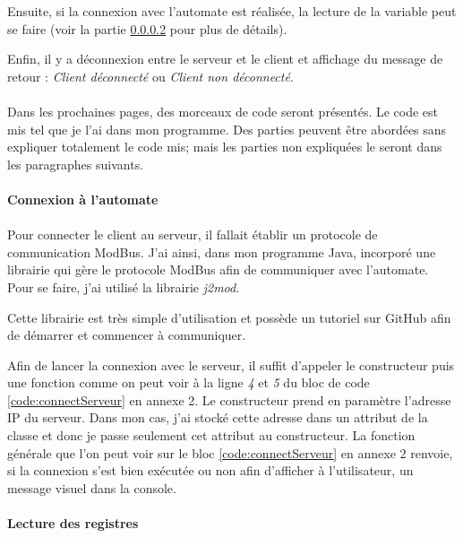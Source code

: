             Ensuite, si la connexion avec l'automate est réalisée, la lecture de la variable peut se faire (voir la partie \ref{part:lectureReg} pour plus de détails).
            
            Enfin, il y a déconnexion entre le serveur et le client et affichage du message de retour : \textit{Client déconnecté} ou \textit{Client non déconnecté}.
            
            \paragraph*{}
            Dans les prochaines pages, des morceaux de code seront présentés. Le code est mis tel que je l'ai dans mon programme. Des parties peuvent être abordées sans expliquer totalement le code mis; mais les parties non expliquées le seront dans les paragraphes suivants.
        
        \paragraph{Connexion à l'automate}
        \label{part:connectAuto}
            \paragraph*{}
            Pour connecter le client au serveur, il fallait établir un protocole de communication ModBus. J'ai ainsi, dans mon programme Java, incorporé une librairie qui gère le protocole ModBus afin de communiquer avec l'automate. Pour se faire, j'ai utilisé la librairie \textit{j2mod}\cite{j2mod}.
            
            Cette librairie est très simple d'utilisation et possède un tutoriel sur GitHub afin de démarrer et commencer à communiquer\cite{j2modGithub}.
            
            Afin de lancer la connexion avec le serveur, il suffit d'appeler le constructeur puis une fonction comme on peut voir à la ligne \textit{4} et \textit{5} du bloc de code \ref{code:connectServeur} en annexe 2. Le constructeur prend en paramètre l'adresse IP du serveur. Dans mon cas, j'ai stocké cette adresse dans un attribut de la classe et donc je passe seulement cet attribut au constructeur. La fonction générale que l'on peut voir sur le bloc \ref{code:connectServeur} en annexe 2 renvoie, si la connexion s'est bien exécutée ou non afin d'afficher à l'utilisateur, un message visuel dans la console.
    
        \paragraph{Lecture des registres}
        \label{part:lectureReg}
